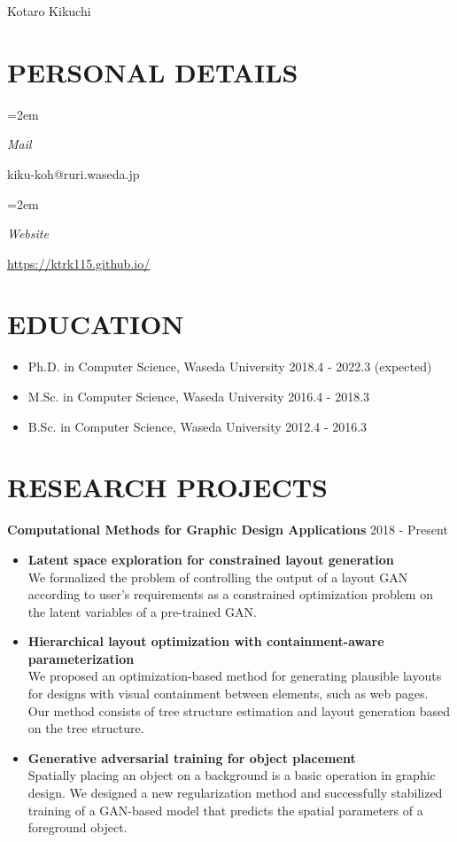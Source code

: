 \documentclass[paper=a4,fontsize=11pt]{scrartcl} %
\newlength{\spacebox}
\newcommand{\sepspace}{\vspace*{1em}}        %
\newcommand{\MyName}[1]{ %
        \begin{center}
        \Huge \usefont{OT1}{phv}{b}{n} #1
      \end{center}}
\newcommand{\MySlogan}[1]{ %
        \large \usefont{OT1}{phv}{m}{n}\hfill \textit{#1}
        \par \normalsize \normalfont}
\newcommand{\NewPart}[1]{\section*{\uppercase{#1}}}
\newcommand{\PersonalEntry}[2]{
        \noindent\hangindent=2em\hangafter=0 %
        \parbox{\spacebox}{        %
        \textit{#1}}               %
        \hspace{1.5em} #2 \par}    %
\begin{document}

\MyName{Kotaro Kikuchi}


\NewPart{Personal details}{}

\PersonalEntry{Mail}{kiku-koh@ruri.waseda.jp}
\PersonalEntry{Website}{\url{https://ktrk115.github.io/}}

\NewPart{Education}{}
\begin{itemize}[leftmargin=2em,topsep=0.5em,itemsep=0em]
    \item[] Ph.D. in Computer Science, Waseda University \hfill 2018.4 - 2022.3 (expected)
    \item[] M.Sc. in Computer Science, Waseda University \hfill 2016.4 - 2018.3
    \item[] B.Sc. in Computer Science, Waseda University \hfill 2012.4 - 2016.3
\end{itemize}

\NewPart{Research projects}{}
\noindent \textbf{Computational Methods for Graphic Design Applications} \hfill 2018 - Present
\begin{itemize}[leftmargin=2em,topsep=0.5em,itemsep=0em]
    \item \textbf{Latent space exploration for constrained layout generation} \\
    We formalized the problem of controlling the output of a layout GAN
    according to user's requirements as a constrained optimization problem on
    the latent variables of a pre-trained GAN.
    \item \textbf{Hierarchical layout optimization {\small with containment-aware parameterization}} \\
    We proposed an optimization-based method for generating plausible layouts
    for designs with visual containment between elements, such as web pages. Our
    method consists of tree structure estimation and layout generation based on
    the tree structure.
    \item \textbf{Generative adversarial training for object placement} \\
    Spatially placing an object on a background is a basic operation in graphic
    design.  We designed a new regularization method and successfully stabilized
    training of a GAN-based model that predicts the spatial parameters of a
    foreground object.
\end{itemize}
\end{document}
